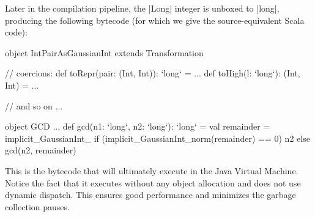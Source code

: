 Later in the compilation pipeline, the |Long| integer is unboxed to |long|, producing the following bytecode (for which we give the source-equivalent Scala code):

\vspace{0.2em}
\begin{lstlisting-nobreak}
object IntPairAsGaussianInt extends Transformation{
  // coercions:
  def toRepr(pair: (Int, Int)): `long` = ...
  def toHigh(l: `long`): (Int, Int) = ...

  // and so on ...
}

object GCD {
  ...
  def gcd(n1: `long`, n2: `long`): `long` = {
    val remainder = implicit_GaussianInt_%
    if (implicit_GaussianInt_norm(remainder) == 0) n2 else gcd(n2, remainder)
  }
}
\end{lstlisting-nobreak}

This is the bytecode that will ultimately execute in the Java Virtual Machine. Notice the fact that it executes without any object allocation and does not use dynamic dispatch. This ensures good performance and minimizes the garbage collection pauses. 
\vspace{-2em}
